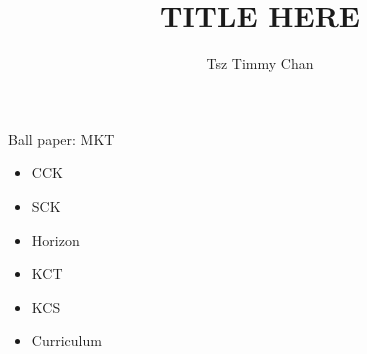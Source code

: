 \documentclass{TC}
\title{TITLE HERE}	%
\author{Tsz Timmy Chan}	%
\begin{document}
Ball paper: \gls{MKT} 
\begin{itemize}
\item \gls{CCK}
\item \gls{SCK}
\item Horizon
\item \gls{KCT}
\item \gls{KCS}
\item Curriculum
\end{itemize}
\end{document}
